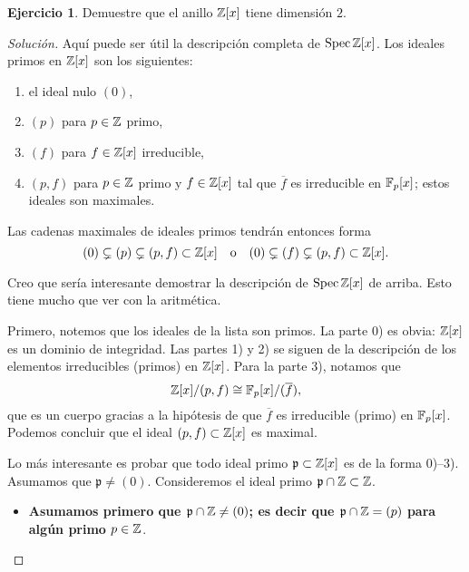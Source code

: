 \documentclass{article}
\theoremstyle{definition}
\newtheorem{ejerc}{Ejercicio}
\newenvironment{solucion}{\begin{proof}[Solución]}{\end{proof}}
\begin{document}
\begin{ejerc}
  Demuestre que el anillo $\mathbb{Z} [x]$ tiene dimensión $2$.

  \ifdefined\solutions\begin{solucion}
    Aquí puede ser útil la descripción completa de $\operatorname{Spec} \mathbb{Z} [x]$. Los ideales
    primos en $\mathbb{Z} [x]$ son los siguientes:

    \begin{enumerate}
    \item[0)] el ideal nulo $(0)$,

    \item[1)] $(p)$ para $p \in \mathbb{Z}$ primo,

    \item[2)] $(f)$ para $f \in \mathbb{Z} [x]$ irreducible,

    \item[3)] $(p,f)$ para $p \in \mathbb{Z}$ primo y $f \in \mathbb{Z} [x]$ tal que
      $\overline{f}$ es irreducible en $\mathbb{F}_p [x]$; estos ideales son maximales.
    \end{enumerate}

    Las cadenas maximales de ideales primos tendrán entonces forma
    \[ (0) \subsetneq (p) \subsetneq (p,f) \subset \mathbb{Z} [x]
       \quad\text{o}\quad
       (0) \subsetneq (f) \subsetneq (p,f) \subset \mathbb{Z} [x]. \]

    \vspace{1em}

    Creo que sería interesante demostrar la descripción de $\operatorname{Spec} \mathbb{Z} [x]$ de
    arriba. Esto tiene mucho que ver con la aritmética.

    Primero, notemos que los ideales de la lista son primos. La parte 0) es
    obvia: $\mathbb{Z} [x]$ es un dominio de integridad. Las partes 1) y 2) se siguen
    de la descripción de los elementos irreducibles (primos) en $\mathbb{Z} [x]$. Para
    la parte 3), notamos que
    $$\mathbb{Z} [x]/(p,f) \cong \mathbb{F}_p [x] / (\overline{f}),$$
    que es un cuerpo gracias a la hipótesis de que $\overline{f}$ es irreducible
    (primo) en $\mathbb{F}_p [x]$. Podemos concluir que el ideal
    $(p,f) \subset \mathbb{Z} [x]$ es maximal.

    Lo más interesante es probar que todo ideal primo
    $\mathfrak{p} \subset \mathbb{Z} [x]$ es de la forma 0)--3). Asumamos que
    $\mathfrak{p} \ne (0)$. Consideremos el ideal primo
    $\mathfrak{p} \cap \mathbb{Z} \subset \mathbb{Z}$.

    \begin{itemize}
    \item[i)] \textbf{Asumamos primero que $\mathfrak{p} \cap \mathbb{Z} \ne (0)$; es
        decir que $\mathfrak{p} \cap \mathbb{Z} = (p)$ para algún primo $p\in \mathbb{Z}$}.


\end{itemize}
\end{solucion}
\end{ejerc}
\end{document}

